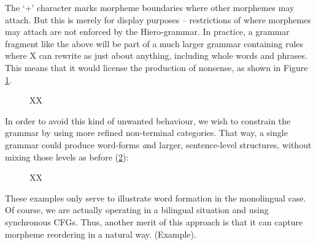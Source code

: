 The `+' character marks morpheme boundaries where other morphemes may attach.
But this is merely for display purposes -- restrictions of where morphemes may attach are not enforced by the Hiero-grammar.
In practice, a grammar fragment like the above will be part of a much larger grammar containing rules where X can rewrite as just about anything, including whole words and phrases.
This means that it would license the production of nonsense, as shown in Figure \ref{fig:unlabelled_word_derivation2}.

\begin{figure}[h]
 \centering
 \hspace{10mm}
 \caption{XX}
 \label{fig:unlabelled_word_derivation2}
\end{figure}

In order to avoid this kind of unwanted behaviour, we wish to constrain the grammar by using more refined non-terminal categories.
That way, a single grammar could produce word-forms {\emph and} larger, sentence-level structures, without mixing those levels as before (\ref{fig:labelled_word_derivation}):

\begin{figure}[h]
 \centering
 \hspace{10mm}
 \caption{XX}
 \label{fig:labelled_word_derivation}
\end{figure}

These examples only serve to illustrate word formation in the monolingual case.
Of course, we are actually operating in a bilingual situation and using synchronous CFGs.
Thus, another merit of this approach is that it can capture morpheme reordering in a natural way. (Example).


